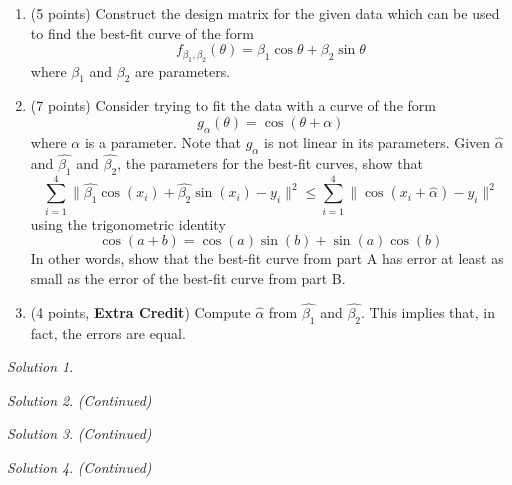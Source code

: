 \documentclass{article}
\theoremstyle{remark} \newtheorem*{solution}{Solution}
\begin{document}
\begin{enumerate}
\item
  (5 points) Construct the design matrix for the given data which can
  be used to find the best-fit curve of the form
  \begin{displaymath}
    f_{\beta_1, \beta_2}(\theta) = \beta_1 \cos\theta + \beta_2
    \sin\theta
  \end{displaymath}
  where $\beta_1$ and $\beta_2$ are parameters.
\item
  (7 points) Consider trying to fit the data with a curve of the form
  \begin{displaymath}
    g_\alpha(\theta) = \cos(\theta + \alpha)
  \end{displaymath}
  where $\alpha$ is a parameter. Note that $g_\alpha$ is not linear in
  its parameters.  Given $\hat{\alpha}$ and $\hat{\beta_1}$ and
  $\hat{\beta_2}$, the parameters for the best-fit curves, show that
  \begin{displaymath}
    \sum_{i = 1}^4 \| \hat{\beta_1}\cos(x_i) + \hat{\beta_2}\sin(x_i)
    - y_i\|^2 \leq \sum_{i = 1}^4 \| \cos(x_i + \hat \alpha) - y_i\|^2
  \end{displaymath}
  using the trigonometric identity
  \begin{displaymath}
    \cos(a + b) = \cos(a)\sin(b) + \sin(a)\cos(b)
  \end{displaymath}
  In other words, show that the best-fit curve from part A has error
  at least as small as the error of the best-fit curve from part B.
\item
  (4 points, \textbf{Extra Credit}) Compute $\hat{\alpha}$ from
  $\hat{\beta_1}$ and $\hat{\beta_2}$. This implies that, in fact, the
  errors are equal.
\end{enumerate}

\medskip

\begin{solution}
\end{solution}

\pagebreak
\begin{solution}
  \textit{(Continued)}
\end{solution}

\pagebreak
\begin{solution}
  \textit{(Continued)}
\end{solution}

\pagebreak
\begin{solution}
  \textit{(Continued)}
\end{solution}
\end{document}
